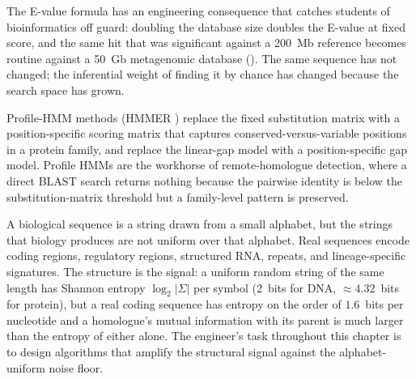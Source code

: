 The E-value formula has an engineering consequence that catches
students of bioinformatics off guard: doubling the database size
doubles the E-value at fixed score, and the same hit that was
significant against a 200~Mb reference becomes routine against a 50~Gb
metagenomic database (). The same
sequence has not changed; the inferential weight of finding it by
chance has changed because the search space has grown.



Profile-HMM methods (HMMER \cite{paper:v6c11-eddy-hmmer-2011}) replace
the fixed substitution matrix with a position-specific scoring matrix
that captures conserved-versus-variable positions in a protein family,
and replace the linear-gap model with a position-specific gap model.
Profile HMMs are the workhorse of remote-homologue detection, where a
direct BLAST search returns nothing because the pairwise identity is
below the substitution-matrix threshold but a family-level pattern is
preserved.

\begin{archetype}
A biological sequence is a string drawn from a small alphabet, but
the strings that biology produces are not uniform over that alphabet.
Real sequences encode coding regions, regulatory regions, structured
RNA, repeats, and lineage-specific signatures. The structure is the
signal: a uniform random string of the same length has Shannon entropy
$\log_2 |\Sigma|$ per symbol (2~bits for DNA, $\approx 4.32$~bits for
protein), but a real coding sequence has entropy on the order of
$1.6$~bits per nucleotide and a homologue's mutual information with
its parent is much larger than the entropy of either alone. The
engineer's task throughout this chapter is to design algorithms that
amplify the structural signal against the alphabet-uniform noise floor.
\end{archetype}

